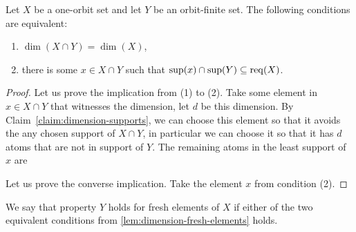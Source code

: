 \begin{lemma}\label{lem:dimension-fresh-elements}
	Let $X$ be a one-orbit set and let $Y$ be an orbit-finite set. The following conditions are equivalent:
	\begin{enumerate}
		\item $\dim(X \cap Y) = \dim(X)$,
		\item there is some $x \in X \cap Y$ such that $\sup(x) \cap \sup(Y) \subseteq  \operatorname{req}(X)$.
	\end{enumerate}
\end{lemma}
\begin{proof}
	Let us prove the implication from (1) to (2).  Take some element in $x \in X \cap Y$ that witnesses the dimension, let $d$ be this dimension. By Claim~\ref{claim:dimension-supports}, we can choose this element so that it avoids the any chosen support of $X \cap Y$, in particular we can choose it so that it has $d$ atoms that are not in support of $Y$. The remaining atoms in the least support of $x$ are

	Let us prove the converse implication. Take the element $x$ from condition (2).
\end{proof}



\begin{definition}
	We say that property $Y$ holds for fresh elements of $X$ if either of the two equivalent conditions from \cref{lem:dimension-fresh-elements} holds.
\end{definition}






